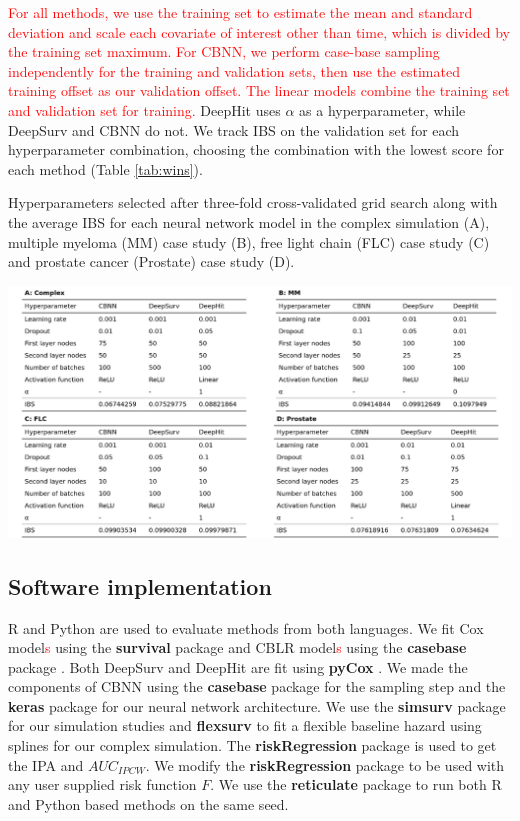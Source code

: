 \documentclass[preprint,12pt,authoryear]{elsarticle}
\begin{document}
\textcolor{red}{For all methods, we use the training set to estimate the mean and standard deviation and scale each covariate of interest other than time, which is divided by the training set maximum. For CBNN, we perform case-base sampling independently for the training and validation sets, then use the estimated training offset as our validation offset. The linear models combine the training set and validation set for training.} DeepHit uses $\alpha$ as a hyperparameter, while DeepSurv and CBNN do not. We track IBS on the validation set for each hyperparameter combination, choosing the combination with the lowest score for each method (Table \ref{tab:wins}).

\begin{table}[H]
\caption{Hyperparameters selected after three-fold cross-validated grid search along with the average IBS for each neural network model in the complex simulation (A), multiple myeloma (MM) case study (B), free light chain (FLC) case study (C) and prostate cancer (Prostate) case study (D).}
\label{tab:wins}
\begin{center}\includegraphics[width=1\linewidth]{Table1.pdf} \end{center}
\end{table}

\hypertarget{software-implementation}{%
\subsection{Software implementation}\label{software-implementation}}

R \citep{Rsoft} and Python \citep{py} are used to evaluate methods from both languages. We fit Cox model\textcolor{red}{s} using the \textbf{survival} package
\citep{survpkg} and CBLR model\textcolor{red}{s} using the \textbf{casebase} package \citep{cbpkg}. Both DeepSurv and DeepHit are fit using \textbf{pyCox}
\citep{lee2018DeepHit}. We made the components of CBNN using the \textbf{casebase} package \citep{cbpkg} for the sampling step and the
\textbf{keras} package \citep{keras} for our neural network architecture. We use the \textbf{simsurv} package \citep{simsurv} for our simulation studies
and \textbf{flexsurv} \citep{flexsurv} to fit a flexible baseline hazard using splines for our complex simulation. The \textbf{riskRegression} package
\citep{riskRegression} is used to get the IPA and $AUC_{IPCW}$. We modify the \textbf{riskRegression} package to be used with any user supplied
risk function \(F\). We use the \textbf{reticulate} package \citep{reticulate} to run both R and Python based methods on the same seed.
\end{document}
